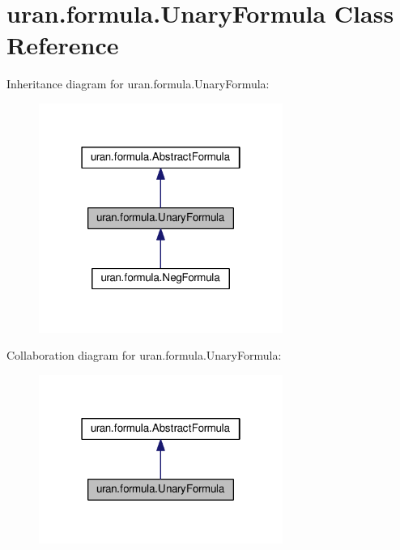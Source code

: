 \hypertarget{classuran_1_1formula_1_1_unary_formula}{}\section{uran.\+formula.\+Unary\+Formula Class Reference}
\label{classuran_1_1formula_1_1_unary_formula}


Inheritance diagram for uran.\+formula.\+Unary\+Formula\+:
\nopagebreak
\begin{figure}[H]
\begin{center}
\leavevmode
\includegraphics[width=226pt]{classuran_1_1formula_1_1_unary_formula__inherit__graph}
\end{center}
\end{figure}


Collaboration diagram for uran.\+formula.\+Unary\+Formula\+:
\nopagebreak
\begin{figure}[H]
\begin{center}
\leavevmode
\includegraphics[width=226pt]{classuran_1_1formula_1_1_unary_formula__coll__graph}
\end{center}
\end{figure}
